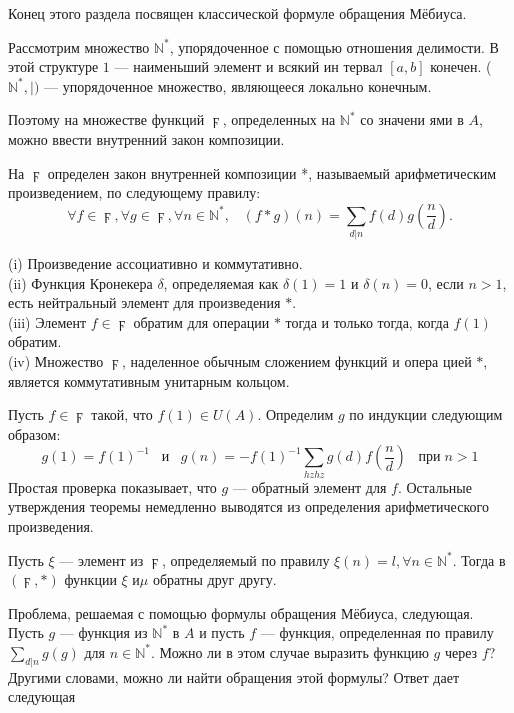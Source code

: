 \documentclass{mai_book}
\begin{document}
Конец этого раздела посвящен классической формуле обращения
Мёбиуса.

Рассмотрим множество $\mathbb{N}^*$, упорядоченное с помощью отношения
делимости. В этой структуре $1$ — наименьший элемент и всякий ин­
тервал $[a,b]$ конечен. ($\mathbb{N}^*, |)$ — упорядоченное множество, являющееся
локально конечным.

Поэтому на множестве функций $\digamma$, определенных на $\mathbb{N}^*$ со значени­
ями в $A$, можно ввести внутренний закон композиции.
\newpage
\begin{determ}
На $\digamma$ определен закон внутренней композиции *, называемый арифметическим произведением, по следующему правилу:
$$\forall f\in\digamma,\forall g\in\digamma,\forall n\in\mathbb{N}^{*},\;\;\;(f*g)(n)=\sum\limits_{d|n}f(d)g\left(\frac{n}{d}\right).$$
\end{determ}
\begin{property}[произведения *]
(i) Произведение ассоциативно и коммутативно.\\
(ii) Функция Кронекера $\delta$, определяемая как $\delta(1)=1$ и $\delta(n)=0$, если
$n>1$, есть нейтральный элемент для произведения $*$.\\
(iii) Элемент $f\in\digamma$ обратим для операции $*$ тогда и только тогда,
когда $f(1)$ обратим.\\
(iv) Множество $\digamma$, наделенное обычным сложением функций и опера­
цией $*$, является коммутативным унитарным кольцом.
\end{property}
\begin{myproof}
Пусть $f\in\digamma$ такой, что $f(1)\in U(A)$. Определим $g$ по индукции следующим образом:
$$g(1)=f(1)^{-1}\;\;\;\text{и}\;\;\;g(n)=-f(1)^{-1}\sum\limits_{hzhz}g(d)f\left(\frac{n}{d}\right)\;\;\;\text{при}\;n>1$$
Простая проверка показывает, что $g$ — обратный элемент для $f$.
Остальные утверждения теоремы немедленно выводятся из опреде­ления арифметического произведения.
\end{myproof}
\begin{property}
Пусть $\xi$ — элемент из $\digamma$, определяемый по правилу $\xi(n)=l,\forall n\in\mathbb{N}^*$. Тогда в $(\digamma,*)$ функции $\xi$ и$\mu$ обратны друг другу.
\end{property}

Проблема, решаемая с помощью формулы обращения Мёбиуса, следующая. Пусть $g$ — функция из $\mathbb{N}^*$ в $A$ и пусть $f$ — функция, определенная по правилу $\sum\nolimits_{d|n}g(g)$ для $n\in\mathbb{N}^*$. Можно ли в этом случае выразить функцию $g$ через $f$? Другими словами, можно ли найти обращения этой формулы? Ответ дает следующая
\end{document}
